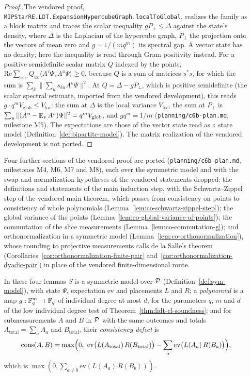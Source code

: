 \begin{proof}
\leanok
The vendored proof, \texttt{MIPStarRE.LDT.ExpansionHypercubeGraph.localToGlobal}, realizes the
family as a block matrix and traces the scalar inequality $g P_\perp \leq \Delta$ against the
state's density, where $\Delta$ is the Laplacian of the hypercube graph, $P_\perp$ the projection
onto the vectors of mean zero and $g = 1/(m q^m)$ its spectral gap. A vector state has no density;
here the inequality is read through Gram positivity instead. For a positive semidefinite scalar
matrix $Q$ indexed by the points, $\mathrm{Re} \sum_{u, v} Q_{u v} \langle A^v \Psi, A^u \Psi
\rangle \geq 0$, because $Q$ is a sum of matrices $s^* s$, for which the sum is $\sum_k \| \sum_u
s_{k u} A^u \Psi \|^2$. At $Q = \Delta - g P_\perp$, which is positive semidefinite (the scalar
spectral estimate, imported from the vendored development), this reads $g \cdot q^m V_{\mathrm{glob}}
\leq V_{\mathrm{loc}}$: the sum at $\Delta$ is the local variance $V_{\mathrm{loc}}$, the sum at $P_\perp$
is $\sum_u \| (A^u - \E_v A^v) \Psi \|^2 = q^m V_{\mathrm{glob}}$, and $g q^m = 1/m$
(\texttt{planning/c6b-plan.md}, milestone M5). The expectations are those of the vector state read
as a state model (Definition~\ref{def:bipartite-model}). The matrix realization of the vendored
development is not ported.
\end{proof}

Four further sections of the vendored proof are ported (\texttt{planning/c6b-plan.md}, milestones
M4, M6, M7 and M8), each over the symmetric model and with the swap and normalization hypotheses of
the vendored statements dropped: the definitions and statements of the main induction step, with
the Schwartz--Zippel step of the vendored main theorem, which passes from consistency on points to
consistency of whole polynomials (Lemma~\ref{lem:co-schwartz-zippel-step}); the global variance of
the points (Lemma~\ref{lem:co-global-variance-of-points}); the commutation of the slice measurements
(Lemma~\ref{lem:co-commutation-g}); and orthonormalization in a symmetric model
(Lemma~\ref{lem:co-orthonormalization}), whose rounding to projective measurements calls de la
Salle's theorem (Corollaries~\ref{cor:orthonormalization-finite-pair}
and~\ref{cor:orthonormalization-dyadic-pair}) in place of the vendored finite-dimensional route.

In these four lemmas $S$ is a symmetric model over $\cal{P}$ (Definition~\ref{def:sym-model}), with
state $\Psi$, expectation $\mathrm{ev}$ and placements $L$ and $R$; a \emph{polynomial} is a map $g :
\Fq^m \to \Fq$ of individual degree at most $d$, for the parameters $q$, $m$ and $d$ of the
low individual degree test of Theorem~\ref{thm:lidt-cl-soundness}; and for submeasurements $A$ and
$B$ in $\cal{P}$ with the same outcomes and totals $A_{\mathrm{total}} = \sum_a A_a$ and
$B_{\mathrm{total}}$, their \emph{consistency defect} is
\[
  \mathrm{cons}(A, B) = \max\Bigl(0,\ \mathrm{ev}\bigl(L(A_{\mathrm{total}})\,
  R(B_{\mathrm{total}})\bigr) - \sum_a \mathrm{ev}\bigl(L(A_a)\, R(B_a)\bigr)\Bigr),
\]
which is $\max(0, \sum_{a \neq b} \mathrm{ev}(L(A_a)\, R(B_b)))$.

